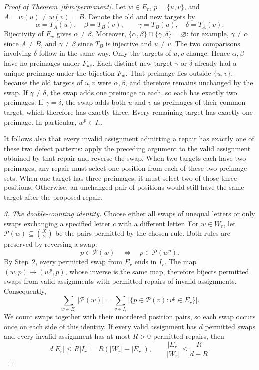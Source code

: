 \documentclass[11pt,a4paper]{article}
\numberwithin{equation}{section}
\numberwithin{figure}{section}
\numberwithin{table}{section}
\numberwithin{footnote}{section}
\theoremstyle{informal}\newtheorem*{informaltheorem}{Informal theorem}
\theoremstyle{definition}\newtheorem{example}{Example}[section]
\theoremstyle{remark}\newtheorem{remark}[theorem]{Remark}
\begin{document}
\begin{proof}[Proof of Theorem~\ref{thm:permanent}]
Let \(w\in E_r\), \(p=\{u,v\}\), and
\(A=w(u)\ne w(v)=B\). Denote the old and new targets by
\begin{equation}
 \alpha=T_A(u),\quad \beta=T_B(v),\qquad
 \gamma=T_B(u),\quad \delta=T_A(v).
\end{equation}
Bijectivity of \(F_w\) gives \(\alpha\ne\beta\).
Moreover,
\(\{\alpha,\beta\}\cap\{\gamma,\delta\}=\varnothing\):
for example, \(\gamma\ne\alpha\) since \(A\ne B\), and
\(\gamma\ne\beta\) since \(T_B\) is injective and \(u\ne v\).
The two comparisons involving \(\delta\) follow in the same way.
Only the targets of \(u,v\) change. Hence \(\alpha,\beta\)
have no preimages under \(F_{w^p}\). Each distinct new target
\(\gamma\) or \(\delta\) already had a unique preimage under
the bijection \(F_w\). That preimage lies outside \(\{u,v\}\),
because the old targets of \(u,v\) were \(\alpha,\beta\), and
therefore remains unchanged by the swap.
If \(\gamma\ne\delta\), the swap adds one preimage to each,
so each has exactly two preimages. If \(\gamma=\delta\), the swap
adds both \(u\) and \(v\) as preimages of their common target,
which therefore has exactly three.
Every remaining target has exactly one preimage. In particular,
\(w^p\in I_r\).

It follows also that every invalid assignment admitting a repair
has exactly one of these two defect patterns: apply the preceding
argument to the valid assignment obtained by that repair and reverse
the swap. When two targets each have two preimages, any repair must
select one position from each of these two preimage sets. When one
target has three preimages, it must select two of those three
positions. Otherwise, an unchanged pair of positions would still
have the same target after the proposed repair.

\emph{3. The double-counting identity.}
Choose either all swaps of unequal letters or only swaps exchanging
a specified letter \(c\) with a different letter. For \(w\in W_r\),
let \(\mathcal P(w)\subseteq\binom X2\) be the pairs permitted
by the chosen rule. Both rules are preserved by reversing a swap:
\begin{equation}
 p\in\mathcal P(w)\quad\Longleftrightarrow\quad
 p\in\mathcal P(w^p).
\end{equation}
By Step~2, every permitted swap from \(E_r\) ends in \(I_r\).
The map \((w,p)\mapsto(w^p,p)\), whose inverse is the same map,
therefore bijects permitted swaps from valid assignments with
permitted repairs of invalid assignments. Consequently,
\begin{equation}\label{eq:switching-count}
 \sum_{w\in E_r}|\mathcal P(w)|
 =\sum_{v\in I_r}
   |\{p\in\mathcal P(v):v^p\in E_r\}|.
\end{equation}
We count swaps together with their unordered position pairs, so each
swap occurs once on each side of this identity. If every valid
assignment has \(d\) permitted swaps and every invalid assignment
has at most \(R>0\) permitted repairs, then
\begin{equation}\label{eq:switching-density}
 d|E_r|\leq R|I_r|=R(|W_r|-|E_r|),\qquad
 \frac{|E_r|}{|W_r|}\leq\frac{R}{d+R}.
\end{equation}


\end{proof}
\end{document}
